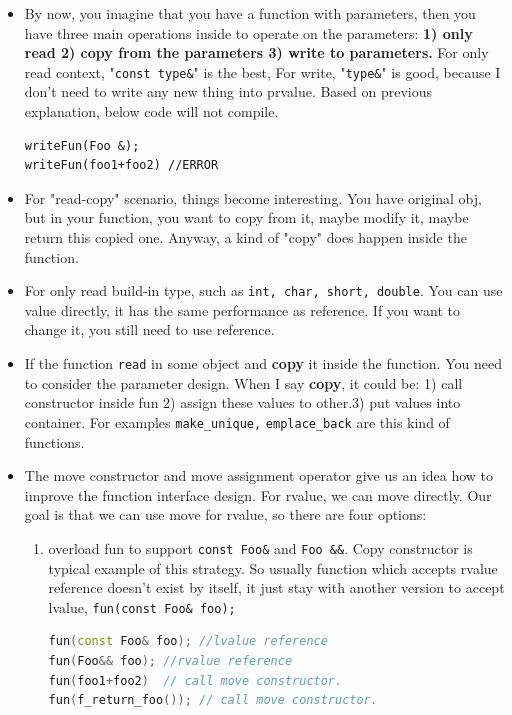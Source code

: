 \documentclass[a4paper,11pt,twoside]{book}
\begin{document}
\begin{itemize}

	\item  By now, you imagine that you have a function with parameters, then you have three main operations inside to operate on the parameters: \textbf{1) only read 2) copy from the parameters 3) write to parameters.} For only read context, "\texttt{const type\&}" is the best, For write, "\texttt{type\&}" is good, because I don't need to write any new thing into prvalue. Based on previous explanation, below code will not compile. 
\begin{lstlisting}[numbers=none]
writeFun(Foo &);
writeFun(foo1+foo2) //ERROR
\end{lstlisting}

	\item For "read-copy" scenario, things become interesting. You have original obj, but in your function, you want to copy from it, maybe modify it, maybe return this copied one. Anyway, a kind of "copy" does happen inside the function.

    \item For only read build-in type, such as \texttt{int, char, short, double}. You can use value directly, it has the same performance as reference. If you want to change it, you still need to use reference.

    \item If the function \texttt{read} in some object and \textbf{copy} it inside the function. You need to consider the parameter design. When I say \textbf{copy}, it could be: 1) call constructor inside fun 2) assign these values to other.3) put values into container. For examples \texttt{make\_unique,} \texttt{emplace\_back} are this kind of functions.

	\item The move constructor and move assignment operator give us an idea how to improve the function interface design.  For rvalue, we can move directly. Our goal is that we can use move for rvalue, so there are four options: 

	\begin{enumerate}
		\item overload fun to support \texttt{const Foo\&} and \texttt{Foo \&\&}. Copy constructor is typical example of this strategy. So usually function which accepts rvalue reference doesn't exist by itself, it just stay with another version to accept lvalue, \texttt{fun(const Foo\& foo);}
\begin{lstlisting}[frame=single, language=c++]
fun(const Foo& foo); //lvalue reference
fun(Foo&& foo); //rvalue reference
fun(foo1+foo2)  // call move constructor.
fun(f_return_foo()); // call move constructor.
\end{lstlisting}		
		

\end{enumerate}
\end{itemize}
\end{document}
